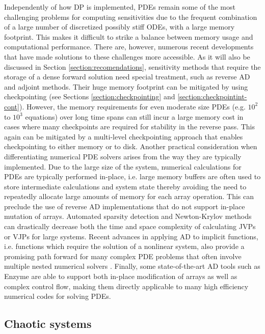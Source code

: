 Independently of how DP is implemented, PDEs remain some of the most challenging problems for computing sensitivities due to the frequent combination of a large number of discretized possibly stiff ODEs, with a large memory footprint. 
This makes it difficult to strike a balance between memory usage and computational performance. 
There are, however, numerous recent developments that have made solutions to these challenges more accessible. 
As it will also be discussed in Section \ref{section:recomendations}, sensitivity methods that require the storage of a dense forward solution need special treatment, such as reverse AD and adjoint methods. 
Their huge memory footprint can be mitigated by using checkpointing (see Sections \ref{section:checkpointing} and \ref{section:checkpointint-cont}).
However, the memory requirements for even moderate size PDEs (e.g. $10^2$ to $10^3$ equations) over long time spans can still incur a large memory cost in cases where many checkpoints are required for stability in the reverse pass. 
This again can be mitigated by a multi-level checkpointing approach that enables checkpointing to either memory or to disk.
Another practical consideration when differentiating numerical PDE solvers arises from the way they are typically implemented. 
Due to the large size of the system, numerical calculations for PDEs are typically performed in-place, i.e. large memory buffers are often used to store intermediate calculations and system state thereby avoiding the need to repeatedly allocate large amounts of memory for each array operation. 
This can preclude the use of reverse AD implementations that do not support in-place mutation of arrays.
Automated sparsity detection \cite{gowdaSparsityProgrammingAutomated2019} and Newton-Krylov methods \cite{knollJacobianfreeNewtonKrylov2004,montoisonKrylovJlJulia2023} can drastically decrease both the time and space complexity of calculating JVPs or VJPs for large systems. 
Recent advances in applying AD to implicit functions, i.e. functions which require the solution of a nonlinear system, also provide a promising path forward for many complex PDE problems that often involve multiple nested numerical solvers \cite{blondelEfficientModularImplicit2022a}. 
Finally, some state-of-the-art AD tools such as Enzyme \cite{moses_Enzyme} are able to support both in-place modification of arrays as well as complex control flow, making them directly applicable to many high efficiency numerical codes for solving PDEs.


\subsection{Chaotic systems}

